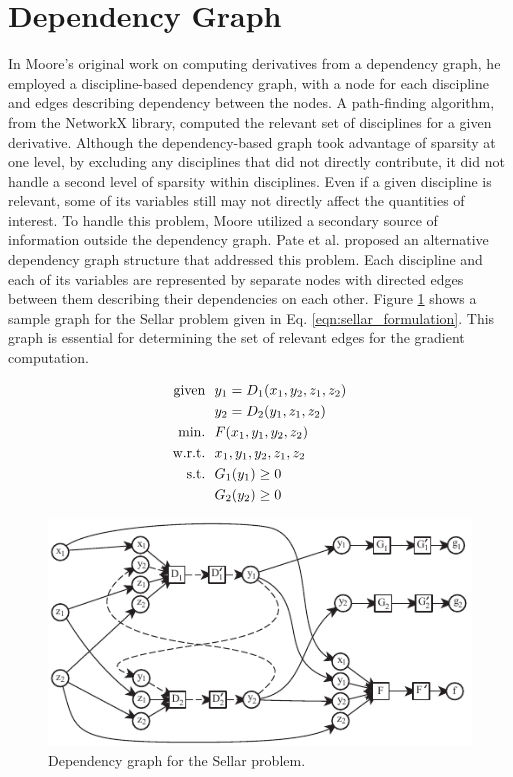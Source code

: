 \documentclass[]{aiaa-tc} %
\newcommand{\txt}{\textrm}
\begin{document}
  \section{Dependency Graph}\label{section:depgraph}

    In Moore's original work on computing derivatives from a dependency graph, he employed
    a discipline-based dependency graph, with a node for each discipline and edges describing
    dependency between the nodes. A path-finding algorithm, from the NetworkX library\cite{hagberg-2008-exploring},
    computed the relevant set of disciplines for a given derivative. Although the dependency-based graph took advantage of sparsity at
    one level, by excluding any disciplines that did not directly contribute, it did not handle a second level of sparsity
    within disciplines. Even if a given discipline is relevant, some of its variables still may not
    directly affect the quantities of interest. To handle this problem, Moore utilized a secondary source of information
    outside the dependency graph. Pate et al. proposed an alternative dependency graph
    structure that addressed this problem\cite{graph_problem2013}. Each discipline and each of its variables are
    represented by separate nodes with directed edges between them describing their dependencies on each other.
    Figure \ref{fig:sellar_graph} shows a sample graph for the Sellar problem \cite{AIAA:sellar}
    given in Eq. \ref{eqn:sellar_formulation}. This graph is essential for determining the set of relevant edges
    for the gradient computation.

    \begin{align}
        \txt{given} & \ \ y_1 = D_1(x_1,y_2,z_1,z_2) \notag
        \\      & \ \ y_2 = D_2(y_1,z_1,z_2) \notag
        \\\txt{min.} &\ \ F(x_1,y_1,y_2,z_2) \notag
        \\\txt{w.r.t.} & \ \ x_1,y_1,y_2,z_1,z_2 \notag
        \\\txt{s.t.} & \ \ G_1(y_1) \geq 0 \notag
        \\     & \ \ G_2(y_2) \geq 0
        \label{eqn:sellar_formulation}
    \end{align}

    \begin{figure}[!htb]\begin{center}
      \includegraphics[width=.8\textwidth]{images/sellar_cycles}
      \caption{ Dependency graph for the Sellar problem. \label{fig:sellar_graph}}
    \end{center}\end{figure}
\end{document}
